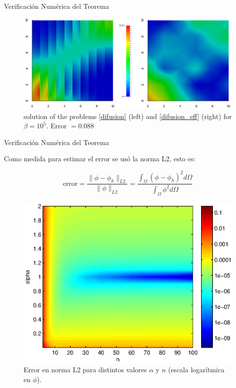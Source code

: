 \documentclass[11pt,spanish]{beamer}
\providecommand{\norm}[1]{\lVert#1\rVert}	  %
\begin{document}
\begin{frame}{Verificación Numérica del Teorema}
\begin{figure}[H]
\centering
\includegraphics[height = 4 cm]{fig/theorem_verification_r1-beta10_5}
\caption{solution of the problems \ref{difusion} (left) and \ref{difusion_eff} (right) for $\beta = 10^{5}$. Error $= 0.088$} \label{fig:verification-beta10e+5}
\end{figure}
\end{frame}

\begin{frame}{Verificación Numérica del Teorema}

Como medida para estimar el error se usó la norma L2, esto es:

\begin{equation}
\text{error} = \frac{\norm{\phi - \phi_h}_{L2}}{\norm{\phi}_{L2}} = \frac{\int_{\Omega} (\phi - \phi_h)^2 d\Omega}{\int_{\Omega} \phi^2 d \Omega}
\end{equation}

\begin{figure}[H]
\centering
\includegraphics[height = 5 cm]{fig/theorem_verification_r1-error_l2}
\caption{Error en norma L2 para distintos valores $\alpha$ y $n$ (escala logarítmica en $\phi$).}
\end{figure}
\end{frame}
\end{document}
